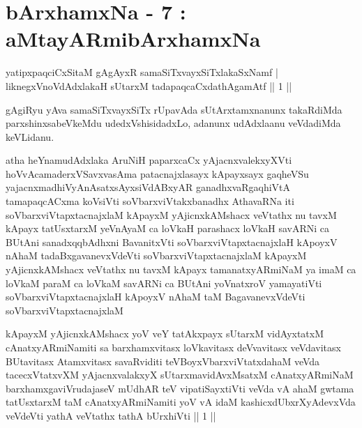 
\chapter{bArxhamxNa - 7 : aMtayARmibArxhamxNa}

\begin{shl}
yatipxpaqciCxSitaM gAgAyxR samaSiTxvayxSiTxlakaSxNamf |\\
liknegxVnoVdAdxlakaH sUtarxM tadapaqcaCxdathA\s \s gamAtf \hfill || 1 ||
\end{shl}

\begin{artha}
gAgiRyu yAva samaSiTxvayxSiTx rUpavAda sUtArxtamxnanunx takaRdiMda parxshinxsabeVkeMdu udedxVshisidadxLo, adanunx udAdxlaanu veVdadiMda keVLidanu.
\end{artha}


\begin{kandikeshl}
atha heYnamudAdxlaka AruNiH paparxcaCx yAjacnxvalekxyXVti hoVvAca\break maderxVSavxvasAma patacnajxlasayx kApayxsayx gaqheVSu yajacnxmadhiVyAnAsatxsAyxsiVdABxyAR ganadhxvaRgaqhiVtA tamapaqcACxma koV\s siVti soV\s barxviVtakxbanadhx AthavaRNa iti soV\s barxviVtapxtacnajxlaM kApayxM yAjicnxkAMshacx veVtathx nu tavxM kApayx tatUsxtarxM yeVnAyaM ca loVkaH parashacx loVkaH savARNi ca BUtAni sanadxqqbAdhxni BavanitxVti soV\s barxviVtapxtacnajxlaH kApoyxV nAhaM tadaBxgavanevxVdeVti soV\s barxviVtapxtacnajxlaM kApayxM yAjicnxkAMshacx veVtathx nu tavxM kApayx tamanatxyARmiNaM ya imaM ca loVkaM paraM ca loVkaM savARNi ca BUtAni yoV\s natxroV yamayatiVti soV\s barxviVtapxtacnajxlaH kApoyxV nAhaM taM BagavanevxVdeVti soV\s barxviVtapxtacnajxlaM 
\end{kandikeshl}

\begin{kandikeshl}
kApayxM yAjicnxkAMshacx yoV veY tatAkxpayx sUtarxM vidAyxtatxM cAnatxyARmiNamiti sa barxhamxvitasx loVkavitasx deVvavitasx veVdavitasx BUtavitasx Atamxvitasx savaRviditi teVBoyxV\s barxviVtatxdahaM veVda tacecxVtatxvXM yAjacnxvalakxyX sUtarxmavidAvxMsatxM cAnatxyARmiNaM barxhamxgaviVrudajaseV mUdhAR teV vipatiSayxtiVti veVda vA ahaM gwtama tatUsxtarxM taM cAnatxyARmiNamiti yoV vA idaM kashicxdUbxrXyAdevxVda veVdeVti yathA veVtathx tathA bUrxhiVti || 1 ||
\end{kandikeshl}

